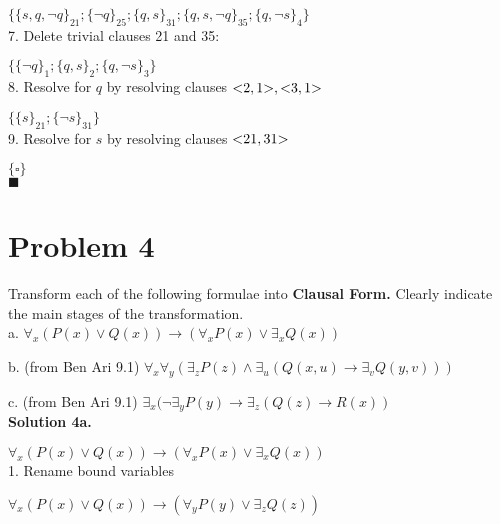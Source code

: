 \documentclass{article}
\begin{document}
{\small{
    $\{
        \{s, q, \neg{q}\}_{21}; 
        \{\neg{q}\}_{25}; 
        \{q, s\}_{31}; 
        \{q, s, \neg{q}\}_{35}; 
        \{q, \neg{s}\}_{4}
    \}$
}\\

7. Delete trivial clauses 21 and 35:

\small{
    $\{
        \{\neg{q}\}_{1}; 
        \{q, s\}_{2}; 
        \{q, \neg{s}\}_{3}
    \}$
}\\

8. Resolve for $q$ by resolving clauses $\text{\textless}2, 1\text{\textgreater}, \text{\textless}3, 1\text{\textgreater}$


\small{
    $\{
        \{s\}_{21}; 
        \{\neg{s}\}_{31}
    \}$
}\\

9. Resolve for $s$ by resolving clauses $\text{\textless}21, 31\text{\textgreater}$

\small{
    $\{
        \square
    \}$
}\\

$
\blacksquare
$
\pagebreak
\section*{Problem 4}

Transform each of the following formulae into \textbf{Clausal Form.} Clearly indicate the main stages of the transformation.\\

a. $\forall_x(P(x) \vee Q(x)) \rightarrow (\forall_xP(x) \vee \exists_xQ(x))$

b. (from Ben Ari 9.1) $\forall_x\forall_y(\exists_zP(z) \wedge \exists_u(Q(x, u) \rightarrow \exists_vQ(y, v)))$

c. (from Ben Ari 9.1) $\exists_x(\neg\exists_yP(y) \rightarrow \exists_z(Q(z) \rightarrow R(x))$\\

\textbf{\large{Solution 4a.}}

$\forall_x(P(x) \vee Q(x)) \rightarrow (\forall_xP(x) \vee \exists_xQ(x))$\\

1. Rename bound variables

$\forall_x(P(x) \vee Q(x)) \rightarrow (\forall_yP(y) \vee \exists_zQ(z))$\\

}
\end{document}
